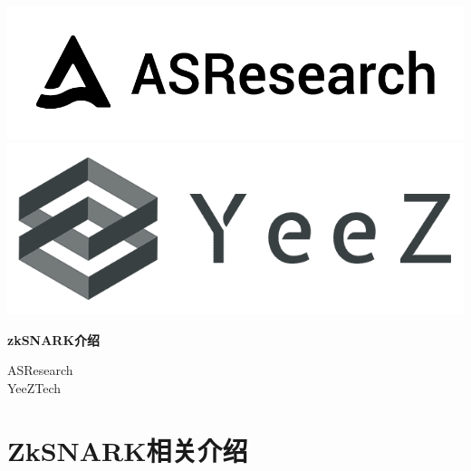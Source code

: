 \documentclass[12pt]{article}
\newcommand{\zk}{zkSNARK}
\begin{document}
\pagestyle{empty}
\renewcommand{\contentsname}{目录}
\renewcommand{\abstractname}{摘要}
\renewcommand{\refname}{参考文献}
\renewcommand{\figurename}{图}
\renewcommand{\tablename}{表}
\renewcommand{\baselinestretch}{1.5}
\renewcommand{\appendixname}{附录}
\renewcommand{\proofname}{证明}

\pagecolor{\pcolor}



\begin{titlepage}
  \begin{center}
    \vspace*{2.5cm}
    \includegraphics[scale=0.2]{../common/logo.png}\\
    \includegraphics[scale=0.2]{../common/yeez.png}

    \vspace{3.5cm}


   \textbf{\huge{\zk 介绍}}

    \vspace{2.5cm}
    ASResearch\\YeeZTech
    \textbf{}
  \end{center}

\end{titlepage}
\setcounter{page}{0}
\tableofcontents
\newpage
\setcounter{page}{1}
\pagestyle{fancy}
\vspace*{0.01cm}

\section{ZkSNARK相关介绍}
\end{document}

